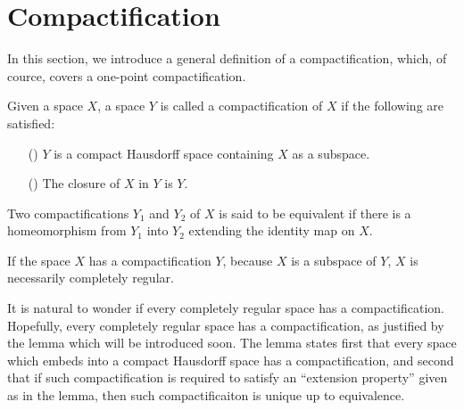 \section{Compactification}

In this section, we introduce a general definition of a compactification, which, of cource, covers a one-point compactification.
\begin{defi}[Compactification]
    Given a space $X$, a space $Y$ is called a compactification of $X$ if the following are satisfied:
    \begin{enumerate}
        \item[(\romannumeral 1)]
        {
            $Y$ is a compact Hausdorff space containing $X$ as a subspace.
        }
        \item[(\romannumeral 2)]
        {
            The closure of $X$ in $Y$ is $Y$.
        }
    \end{enumerate}
    Two compactifications $Y_1$ and $Y_2$ of $X$ is said to be equivalent if there is a homeomorphism from $Y_1$ into $Y_2$ extending the identity map on $X$.
\end{defi}
\begin{rmk}
    If the space $X$ has a compactification $Y$, because $X$ is a subspace of $Y$, $X$ is necessarily completely regular.
\end{rmk}
It is natural to wonder if every completely regular space has a compactification.
Hopefully, every completely regular space has a compactification, as justified by the lemma which will be introduced soon.
The lemma states first that every space which embeds into a compact Hausdorff space has a compactification, and second that if such compactification is required to satisfy an ``extension property'' given as in the lemma, then such compactificaiton is unique up to equivalence.

